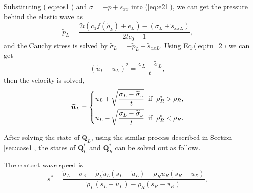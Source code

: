 \documentclass{article}
\numberwithin{equation}{section}
\numberwithin{table}{section}
\begin{document}
Substituting (\ref{eq:eos1}) and $\sigma=-p +s_{xx}$ into (\ref{eq:e21}), we can get the pressure behind the elastic wave as
\begin{equation}
  \widetilde{p}_L= \frac{2t(c_1f(\widetilde{\rho}_L)+e_L)-(\sigma_L+\widetilde{s}_{xxL})}{2tc_0-1},
\end{equation}
and the Cauchy stress is solved by $\widetilde{\sigma}_L = -\widetilde{p}_L+\widetilde{s}_{xxL}$. Using Eq.(\ref{eq:tu_2}) we can get
\begin{equation}
  (\widetilde{u}_L-u_L)^2 = \frac{\sigma_L-\widetilde{\sigma}_L}{t},
\end{equation}
then the velocity is solved,
\begin{equation}
  \widetilde{\bm{u}}_L= \left\{
  \begin{aligned}
	u_L+\sqrt{\frac{\sigma_L-\widetilde{\sigma}_L}{t}} \hspace{0.2cm} \text{if} \hspace{0.2cm} \rho_R^* >\rho_R,\\
	u_L-\sqrt{\frac{\sigma_L-\widetilde{\sigma}_L}{t}} \hspace{0.2cm} \text{if} \hspace{0.2cm} \rho_R^* <\rho_R.\\
\end{aligned} \right.
\end{equation}

After solving  the state of $\widetilde{\bm{Q}}_L$,  using the similar process described in Section \ref{sec:case1}, the states of $\bm{Q}_L^*$ and $\bm{Q}_R^*$ can be solved  out as follows.

The contact wave speed is
\begin{equation}
  s^* = \frac{\widetilde{\sigma}_L-\sigma_R+\widetilde{\rho}_L \widetilde{u}_L(s_L-\widetilde{u}_L)-\rho_R u_R(s_R-u_R)}{\widetilde{\rho}_L(s_L-\widetilde{u}_L)-\rho_R(s_R-u_R)},
\end{equation}
\end{document}
